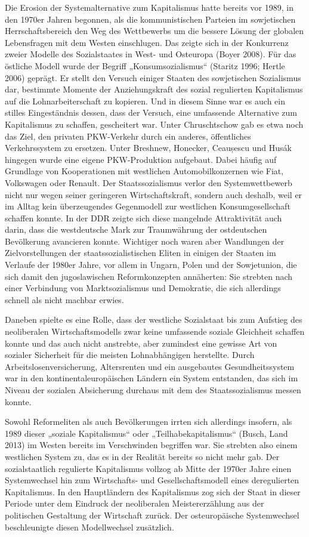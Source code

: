 \begin{multicols*}{2}
    Die Erosion der Systemalternative zum Kapitalismus hatte bereits vor 1989, in den 1970er Jahren begonnen, als die kommunistischen Parteien im sowjetischen Herrschaftsbereich den Weg des Wettbewerbs um die bessere Lösung der globalen Lebensfragen mit dem Westen einschlugen. Das zeigte sich in der Konkurrenz zweier Modelle des Sozialstaates in West- und Osteuropa (Boyer 2008). Für das östliche Modell wurde der Begriff „Konsumsozialismus“ (Staritz 1996; Hertle 2006) geprägt. Er stellt den Versuch einiger Staaten des sowjetischen Sozialismus dar, bestimmte Momente der Anziehungskraft des sozial regulierten Kapitalismus auf die Lohnarbeiterschaft zu kopieren. Und in diesem Sinne war es auch ein stilles Eingeständnis dessen, dass der Versuch, eine umfassende Alternative zum Kapitalismus zu schaffen, gescheitert war. Unter Chruschtschow gab es etwa noch das Ziel, den privaten PKW-Verkehr durch ein anderes, öffentliches Verkehrssystem zu ersetzen. Unter Breshnew, Honecker, Ceaușescu und Husák hingegen wurde eine eigene PKW-Produktion aufgebaut. Dabei häufig auf Grundlage von Kooperationen mit westlichen Automobilkonzernen wie Fiat, Volkswagen oder Renault. 
    Der Staatssozialismus verlor den Systemwettbewerb nicht nur wegen seiner geringeren Wirtschaftskraft, sondern auch deshalb, weil er im Alltag kein überzeugendes Gegenmodell zur westlichen Konsumgesellschaft schaffen konnte. In der DDR zeigte sich diese mangelnde Attraktivität auch darin, dass die westdeutsche Mark zur Traumwährung der ostdeutschen Bevölkerung avancieren konnte. Wichtiger noch waren aber Wandlungen der Zielvorstellungen der staatssozialistischen Eliten in einigen der Staaten im Verlaufe der 1980er Jahre, vor allem in Ungarn, Polen und der Sowjetunion, die sich damit den jugoslawischen Reformkonzepten annäherten: Sie strebten nach einer Verbindung von Marktsozialismus und Demokratie, die sich allerdings schnell als nicht machbar erwies.

Daneben spielte es eine Rolle, dass der westliche Sozialstaat bis zum Aufstieg des neoliberalen Wirtschaftsmodells zwar keine umfassende soziale Gleichheit schaffen konnte und das auch nicht anstrebte, aber zumindest eine gewisse Art von sozialer Sicherheit für die meisten Lohnabhängigen herstellte. Durch Arbeitslosenversicherung, Altersrenten und ein ausgebautes Gesundheitssystem war in den kontinentaleuropäischen Ländern ein System entstanden, das sich im Niveau der sozialen Absicherung durchaus mit dem des Staatssozialismus messen konnte. 

Sowohl Reformeliten als auch Bevölkerungen irrten sich allerdings insofern, als 1989 dieser „soziale Kapitalismus“ oder „Teilhabekapitalismus“ (Busch, Land 2013) im Westen bereits im Verschwinden begriffen war. Sie strebten also einem westlichen System zu, das es in der Realität bereits so nicht mehr gab. Der sozialstaatlich regulierte Kapitalismus vollzog ab Mitte der 1970er Jahre einen Systemwechsel hin zum Wirtschafts- und Gesellschaftsmodell eines deregulierten Kapitalismus. In den Hauptländern des Kapitalismus zog sich der Staat in dieser Periode unter dem Eindruck der neoliberalen Meistererzählung aus der politischen Gestaltung der Wirtschaft zurück. Der osteuropäische Systemwechsel beschleunigte diesen Modellwechsel zusätzlich. 


\end{multicols*}
